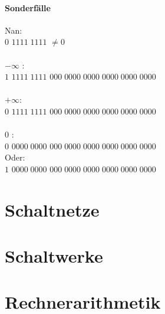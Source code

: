 \documentclass[a4paper]{scrartcl}
\begin{document}
	\paragraph{Sonderfälle}
			Nan:\\
			\colorbox{green!30}{$0$} \colorbox{blue!30}{$1111\;1111$} \colorbox{red!30}{$ \neq 0 $}\\
			\\
			\(- \infty\) :\\
			\colorbox{green!30}{$1$} \colorbox{blue!30}{$1111\;1111$} \colorbox{red!30}{$000\; 0000\; 0000\; 0000\; 0000\; 0000$}\\
			\\
			\(+ \infty\):\\
			\colorbox{green!30}{$0$} \colorbox{blue!30}{$1111\;1111$} \colorbox{red!30}{$000\; 0000\; 0000\; 0000\; 0000\; 0000$}\\
			\\
			0 :\\
			\colorbox{green!30}{$0$} \colorbox{blue!30}{$0000\;0000$} \colorbox{red!30}{$000\; 0000\; 0000\; 0000\; 0000\; 0000$}\\
			Oder:\\
			\colorbox{green!30}{$1$} \colorbox{blue!30}{$0000\;0000$} \colorbox{red!30}{$000\; 0000\; 0000\; 0000\; 0000\; 0000$}\\
	\section{Schaltnetze}
	\section{Schaltwerke}
	\section{Rechnerarithmetik}
	
\end{document}
